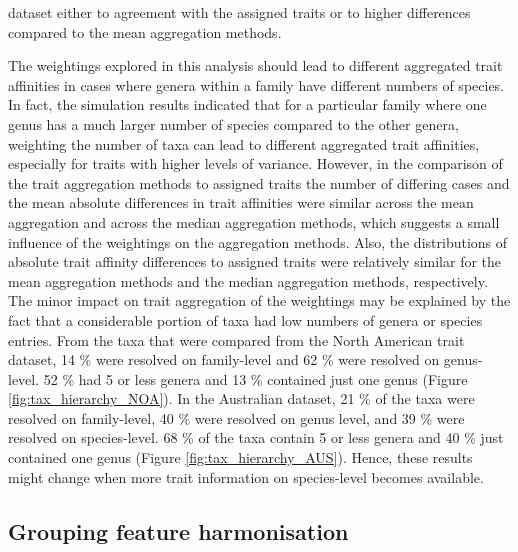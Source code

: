 \documentclass{article}
\begin{document}
dataset either to agreement with the assigned traits or to higher differences compared to the mean aggregation methods. 

The weightings explored in this analysis should lead to different aggregated trait affinities in cases where genera within a family have different numbers of species. In fact, the simulation results indicated that for a particular family where one genus has a much larger number of species compared to the other genera, weighting the number of taxa can lead to different aggregated trait affinities, especially for traits with higher levels of variance. However, in the comparison of the trait aggregation methods to assigned traits the number of differing cases and the mean absolute differences in trait affinities were similar across the mean aggregation and across the median aggregation methods, which suggests a small influence of the weightings on the aggregation methods. Also, the distributions of absolute trait affinity differences to assigned traits were relatively similar for the mean aggregation methods and the median aggregation methods, respectively. The minor impact on trait aggregation of the weightings may be explained by the fact that a considerable portion of taxa had low numbers of genera or species entries. From the taxa that were compared from the North American trait dataset, 14 \% were resolved on family-level and 62 \% were resolved on genus-level. 52 \% had 5 or less genera and 13 \% contained just one genus (Figure \ref{fig:tax_hierarchy_NOA}). In the Australian dataset, 21 \% of the taxa were resolved on family-level, 40 \% were resolved on genus level, and 39 \% were resolved on species-level. 68 \% of the taxa contain 5 or less genera and 40 \% just contained one genus (Figure \ref{fig:tax_hierarchy_AUS}). Hence, these results might change when more trait information on species-level becomes available. 

\subsection*{Grouping feature harmonisation}
\end{document}
